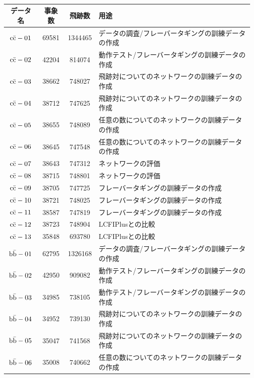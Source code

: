 \begin{table}[htb]
 \centering
　\small
  \begin{tabular}{c c c l} \hline
     データ名 & 事象数 & 飛跡数 & 用途\\ \hline \hline
    $\rm c\bar{c}-01$ & 69581 & 1344465 & データの調査/フレーバータギングの訓練データの作成\\ \hline
    $\rm c\bar{c}-02$ & 42204 & 814074 & 動作テスト/フレーバータギングの訓練データの作成\\ \hline
    $\rm c\bar{c}-03$ & 38662 & 748027 & 飛跡対についてのネットワークの訓練データの作成\\
    $\rm c\bar{c}-04$ & 38712 & 747625 & 飛跡対についてのネットワークの訓練データの作成\\ \hline
    $\rm c\bar{c}-05$ & 38655 & 748089 & 任意の数についてのネットワークの訓練データの作成\\
    $\rm c\bar{c}-06$ & 38645 & 747548 & 任意の数についてのネットワークの訓練データの作成\\ \hline
    $\rm c\bar{c}-07$ & 38643 & 747312 & ネットワークの評価\\
    $\rm c\bar{c}-08$ & 38715 & 748801 & ネットワークの評価\\ \hline 
    $\rm c\bar{c}-09$ & 38705 & 747725 & フレーバータギングの訓練データの作成\\ 
    $\rm c\bar{c}-10$ & 38721 & 748025 & フレーバータギングの訓練データの作成\\
    $\rm c\bar{c}-11$ & 38587 & 747819 & フレーバータギングの訓練データの作成\\ \hline
    $\rm c\bar{c}-12$ & 38723 & 748904 & LCFIPlusとの比較\\
    $\rm c\bar{c}-13$ & 35848 & 693780 & LCFIPlusとの比較\\ \hline\hline
    $\rm b\bar{b}-01$ & 62795 & 1326168 & データの調査/フレーバータギングの訓練データの作成\\ \hline
    $\rm b\bar{b}-02$ & 42950 & 909082 & 動作テスト/フレーバータギングの訓練データの作成\\
    $\rm b\bar{b}-03$ & 34985 & 738105 & 動作テスト/フレーバータギングの訓練データの作成\\ \hline
    $\rm b\bar{b}-04$ & 34952 & 739130 & 飛跡対についてのネットワークの訓練データの作成\\ 
    $\rm b\bar{b}-05$ & 35047 & 741568 & 飛跡対についてのネットワークの訓練データの作成\\ \hline
    $\rm b\bar{b}-06$ & 35008 & 740662 & 任意の数についてのネットワークの訓練データの作成\\ 

\end{tabular}
\end{table}
